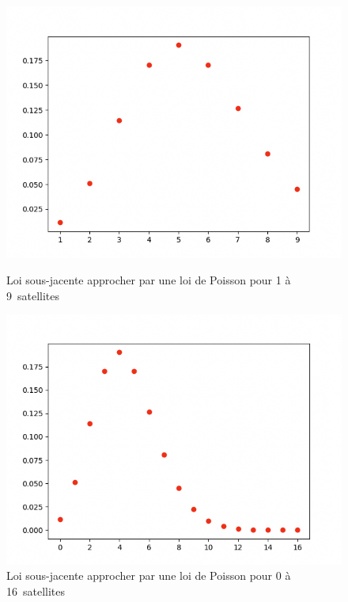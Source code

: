 \begin{figure}[!h]
\begin{minipage}{.54\linewidth}
\begin{center}
            \includegraphics[width=1\textwidth]{img/figure1.png}
            \caption{\label{fig:figure1}Loi sous-jacente approcher par une loi de Poisson pour 1 à 9~satellites}

            \includegraphics[width=1\textwidth]{img/figure2.png}
            \caption{\label{fig:figure1}Loi sous-jacente approcher par une loi de Poisson pour 0 à 16~satellites}
        \end{center}
    \end{minipage}
\end{figure}


\vspace{.1cm}

